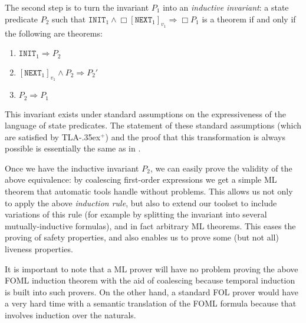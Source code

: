 \documentclass{easychair}
\newcommand{\tlaplus}{\mbox{TLA\kern -.35ex$^+$}\xspace}
\newcommand{\tlax}{\Gamma^{TLA}}
\newcommand{\init}{\texttt{INIT}}
\newcommand{\next}{\texttt{NEXT}}
\newtheorem{lemma}[theorem]{Lemma}
\begin{document}
%

The second step is to turn the invariant $P_1$ into an {\em inductive
invariant}: a state predicate $P_2$ such that
$\init_1\wedge\Box[\next_1]_{v_1}\Rightarrow\Box P_1$ is a theorem if
and only if the following are theorems:
\begin{enumerate}
\item $\init_1\Rightarrow P_2$
\item $[\next_1]_{v_1}\wedge P_2\Rightarrow P_2'$
\item $P_2\Rightarrow P_1$
\end{enumerate}
This invariant exists under standard assumptions on the expressiveness
of the language of state predicates. The statement of these standard
assumptions (which are satisfied by \tlaplus) and the proof that this
transformation is always possible is essentially the same as in \cite{Apt:1981}.

Once we have the inductive invariant $P_2$, we can easily
prove the validity of the above equivalence: by coalescing first-order
expressions we get a simple ML theorem that automatic tools handle
without problems. This allows us not only to apply the above {\em
induction rule}, but also to extend our toolset
to include variations of this rule (for example by
splitting the invariant into several mutually-inductive formulas), and
in fact arbitrary ML theorems. This eases the proving of
safety properties, and also enables us to prove some (but not all)
liveness properties.

It is important to note that a ML prover will have no problem proving
the above FOML induction theorem with the aid of coalescing because
temporal induction is built into such provers. On the other hand, a
standard FOL prover would have a very hard time with a semantic translation
of the FOML formula because that involves induction over the naturals.
\end{document}

